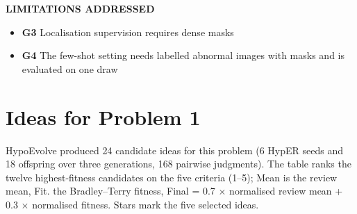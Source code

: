 \documentclass[11pt,a4paper]{article}
\newcommand{\lbl}[1]{{\sffamily\footnotesize\bfseries\color{muted}\MakeUppercase{#1}}\par}
\begin{document}
\lbl{Limitations addressed}\begin{itemize}[leftmargin=1.2em,itemsep=1pt,topsep=2pt]
\item \textbf{G3} Localisation supervision requires dense masks
\item \textbf{G4} The few-shot setting needs labelled abnormal images with masks and is evaluated on one draw
\end{itemize}
\section{Ideas for Problem 1}
HypoEvolve produced 24 candidate ideas for this problem (6 HypER seeds and 18 offspring over three generations, 168 pairwise judgments). The table ranks the twelve highest-fitness candidates on the five criteria (1–5); Mean is the review mean, Fit. the Bradley–Terry fitness, Final = 0.7 $\times$ normalised review mean + 0.3 $\times$ normalised fitness. Stars mark the five selected ideas.
\end{document}

